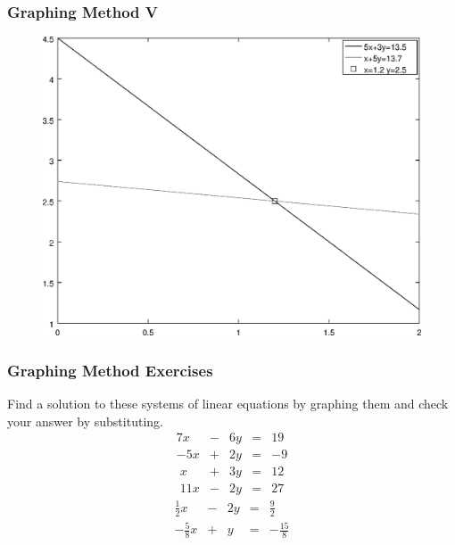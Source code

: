\documentclass[xcolor=dvipsnames]{beamer}
\begin{document}
\begin{frame}
  \frametitle{Graphing Method V}
  \begin{figure}[h]
    \includegraphics[scale=.6]{./gm-03-SystemsEquations-04.eps}
  \end{figure}
\end{frame}

\begin{frame}
  \frametitle{Graphing Method Exercises}
Find a solution to these systems of linear equations by graphing them
and check your answer by substituting.
  \begin{equation}
    \label{eq:fiesebah}
    \begin{array}{rcrcl}
      7x&-&6y&=&19 \\
      -5x&+&2y&=&-9
    \end{array}
  \end{equation}
  \begin{equation}
    \label{eq:weaseiwa}
    \begin{array}{rcrcl}
      x&+&3y&=&12 \\
      11x&-&2y&=&27
    \end{array}
  \end{equation}
  \begin{equation}
    \label{eq:yaetooni}
    \begin{array}{rcrcl}
      \frac{1}{2}x&-&2y&=&\frac{9}{2} \\
      -\frac{5}{8}x&+&y&=&-\frac{15}{8}
    \end{array}
  \end{equation}
\end{frame}
\end{document}
